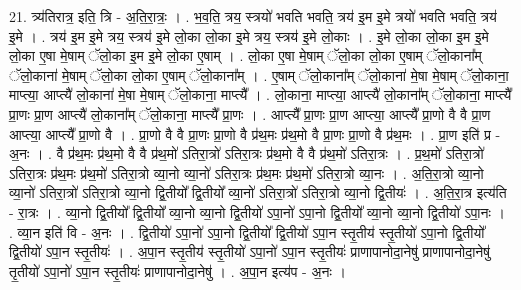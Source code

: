 \documentclass[17pt]{extarticle}
\begin{document}
21. त्र्य॑तिरात्र॒ इति॒ त्रि - अ॒ति॒रा॒त्रः॒ । . भ॒व॒ति॒ त्रय॒ स्त्रयो॑ भवति भवति॒ त्रय॑ इ॒म इ॒मे त्रयो॑ भवति भवति॒ त्रय॑ इ॒मे । . त्रय॑ इ॒म इ॒मे त्रय॒ स्त्रय॑ इ॒मे लो॒का लो॒का इ॒मे त्रय॒ स्त्रय॑ इ॒मे लो॒काः । . इ॒मे लो॒का लो॒का इ॒म इ॒मे लो॒का ए॒षा मे॒षाम् ॅलो॒का इ॒म इ॒मे लो॒का ए॒षाम् । . लो॒का ए॒षा मे॒षाम् ॅलो॒का लो॒का ए॒षाम् ॅलो॒काना᳚म् ॅलो॒काना॑ मे॒षाम् ॅलो॒का लो॒का ए॒षाम् ॅलो॒काना᳚म् । . ए॒षाम् ॅलो॒काना᳚म् ॅलो॒काना॑ मे॒षा मे॒षाम् ॅलो॒काना॒ माप्त्या॒ आप्त्यै॑ लो॒काना॑ मे॒षा मे॒षाम् ॅलो॒काना॒ माप्त्यै᳚ । . लो॒काना॒ माप्त्या॒ आप्त्यै॑ लो॒काना᳚म् ॅलो॒काना॒ माप्त्यै᳚ प्रा॒णः प्रा॒ण आप्त्यै॑ लो॒काना᳚म् ॅलो॒काना॒ माप्त्यै᳚ प्रा॒णः । . आप्त्यै᳚ प्रा॒णः प्रा॒ण आप्त्या॒ आप्त्यै᳚ प्रा॒णो वै वै प्रा॒ण आप्त्या॒ आप्त्यै᳚ प्रा॒णो वै । . प्रा॒णो वै वै प्रा॒णः प्रा॒णो वै प्र॑थ॒मः प्र॑थ॒मो वै प्रा॒णः प्रा॒णो वै प्र॑थ॒मः । . प्रा॒ण इति॑ प्र - अ॒नः । . वै प्र॑थ॒मः प्र॑थ॒मो वै वै प्र॑थ॒मो॑ ऽतिरा॒त्रो॑ ऽतिरा॒त्रः प्र॑थ॒मो वै वै प्र॑थ॒मो॑ ऽतिरा॒त्रः । . प्र॒थ॒मो॑ ऽतिरा॒त्रो॑ ऽतिरा॒त्रः प्र॑थ॒मः प्र॑थ॒मो॑ ऽतिरा॒त्रो व्या॒नो व्या॒नो॑ ऽतिरा॒त्रः प्र॑थ॒मः प्र॑थ॒मो॑ ऽतिरा॒त्रो व्या॒नः । . अ॒ति॒रा॒त्रो व्या॒नो व्या॒नो॑ ऽतिरा॒त्रो॑ ऽतिरा॒त्रो व्या॒नो द्वि॒तीयो᳚ द्वि॒तीयो᳚ व्या॒नो॑ ऽतिरा॒त्रो॑ ऽतिरा॒त्रो व्या॒नो द्वि॒तीयः॑ । . अ॒ति॒रा॒त्र इत्य॑ति - रा॒त्रः । . व्या॒नो द्वि॒तीयो᳚ द्वि॒तीयो᳚ व्या॒नो व्या॒नो द्वि॒तीयो॑ ऽपा॒नो॑ ऽपा॒नो द्वि॒तीयो᳚ व्या॒नो व्या॒नो द्वि॒तीयो॑ ऽपा॒नः । . व्या॒न इति॑ वि - अ॒नः । . द्वि॒तीयो॑ ऽपा॒नो॑ ऽपा॒नो द्वि॒तीयो᳚ द्वि॒तीयो॑ ऽपा॒न स्तृ॒तीय॑ स्तृ॒तीयो॑ ऽपा॒नो द्वि॒तीयो᳚ द्वि॒तीयो॑ ऽपा॒न स्तृ॒तीयः॑ । . अ॒पा॒न स्तृ॒तीय॑ स्तृ॒तीयो॑ ऽपा॒नो॑ ऽपा॒न स्तृ॒तीयः॑ प्राणापानोदा॒नेषु॑ प्राणापानोदा॒नेषु॑ तृ॒तीयो॑ ऽपा॒नो॑ ऽपा॒न स्तृ॒तीयः॑ प्राणापानोदा॒नेषु॑ । . अ॒पा॒न इत्य॑प - अ॒नः । \newline
\end{document}

